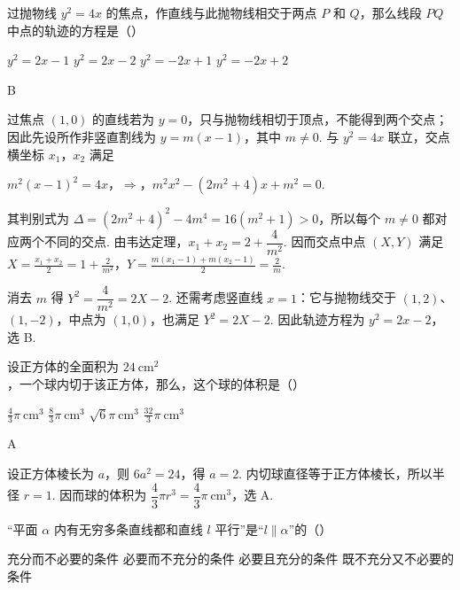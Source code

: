 \begin{problem}
过抛物线 \(y^2 = 4x\) 的焦点，作直线与此抛物线相交于两点 \(P\) 和 \(Q\)，那么线段 \(PQ\) 中点的轨迹的方程是（\quad）

\choices
    {\(y^2 = 2x - 1\)}
    {\(y^2 = 2x - 2\)}
    {\(y^2 = -2x + 1\)}
    {\(y^2 = -2x + 2\)}
\end{problem}

\begin{answer}
B
\end{answer}

\begin{solution}
过焦点 \((1,0)\) 的直线若为 \(y=0\)，只与抛物线相切于顶点，不能得到两个交点；因此先设所作非竖直割线为 \(y=m(x-1)\)，其中 \(m\ne0\). 与 \(y^2=4x\) 联立，交点横坐标 \(x_1\)，\(x_2\) 满足

\(m^2(x-1)^2=4x\)，\(\Longrightarrow\)，\(m^2x^2-(2m^2+4)x+m^2=0\).

其判别式为 \(\Delta=(2m^2+4)^2-4m^4=16(m^2+1)>0\)，所以每个 \(m\ne0\) 都对应两个不同的交点. 由韦达定理，\(x_1+x_2=2+\dfrac4{m^2}\). 因而交点中点 \((X,Y)\) 满足 \(X=\frac{x_1+x_2}{2}=1+\frac2{m^2}\)，\(Y=\frac{m(x_1-1)+m(x_2-1)}2=\frac2m\).

消去 \(m\) 得 \(Y^2=\dfrac4{m^2}=2X-2\). 还需考虑竖直线 \(x=1\)：它与抛物线交于 \((1,2)\)、\((1,-2)\)，中点为 \((1,0)\)，也满足 \(Y^2=2X-2\). 因此轨迹方程为 \(y^2=2x-2\)，选 B.
\end{solution}

\begin{problem}
设正方体的全面积为 \(24\mathrm{~cm}^2\)，一个球内切于该正方体，那么，这个球的体积是（\quad）

\choices
    {\(\frac{4}{3}\pi\mathrm{~cm}^3\)}
    {\(\frac{8}{3}\pi\mathrm{~cm}^3\)}
    {\(\sqrt{6}\pi\mathrm{~cm}^3\)}
    {\(\frac{32}{3}\pi\mathrm{~cm}^3\)}
\end{problem}

\begin{answer}
A
\end{answer}

\begin{solution}
设正方体棱长为 \(a\)，则 \(6a^2=24\)，得 \(a=2\). 内切球直径等于正方体棱长，所以半径 \(r=1\). 因而球的体积为 \(\dfrac43\pi r^3=\dfrac43\pi\mathrm{~cm}^3\)，选 A.
\end{solution}

\begin{problem}
“平面 \(\alpha\) 内有无穷多条直线都和直线 \(l\) 平行”是“\(l \parallel \alpha\)”的（\quad）

\choices
    {充分而不必要的条件}
    {必要而不充分的条件}
    {必要且充分的条件}
    {既不充分又不必要的条件}
\end{problem}

